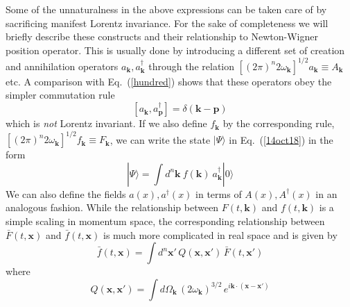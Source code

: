 \documentclass[12pt]{article}
\def\eq#1{{Eq.~(\ref{#1})}}
\def\ket#1{|#1\rangle}                    %
\begin{document}
Some of the  unnaturalness in the above expressions can be taken care of by sacrificing manifest Lorentz invariance.
 For the sake of completeness we will briefly describe these constructs and their relationship to Newton-Wigner position operator.
This is usually done by introducing a different set of creation and annihilation operators $a_{\bm{k}}, a^\dagger_{\bm{k}}$ through the relation 
 $
 [(2\pi)^n 2\omega_{\bm{k}}]^{1/2} a_{\bm{k}} \equiv A_{\bm{k}}
 $ 
 etc. A comparison with \eq{hundred} shows that these operators obey the simpler commutation rule 
 \begin{equation}
 \left[ a_{\bm{k}}, a^\dagger_{\bm{p}}\right] = \delta (\bm{k} - \bm{p})
 \end{equation} 
 which is \textit{not} Lorentz invariant. If we also define $f_{\bm{k}}$ by the corresponding rule, 
 $
 [(2\pi)^n 2\omega_{\bm{k}}]^{1/2} f_{\bm{k}} \equiv F_{\bm{k}}
 $, 
 we can write the state $\ket{\Psi}$ in \eq{14oct18} in the form 
 \begin{equation}
 \ket{\Psi} = \int d^n \bm{k}\ f(\bm{k})\ a^\dagger_{\bm{k}} \ket{0}
 \end{equation} 
 We can also define the fields $a(x), a^\dagger(x)$ in terms of $A(x), A^\dagger(x)$ in an analogous fashion. 
 While the relationship between $F(t, \bm{k})$ and $f(t, \bm{k})$ is a simple scaling in momentum space, the corresponding relationship between $\bar F(t, \bm{x})$ and $\bar f(t, \bm{x})$ is much more complicated in real space and is given by
 \begin{equation}
 \bar f(t,\bm{x}) = \int d^n \bm{x}' \, Q(\bm{x}, \bm{x}')\, \bar F(t, \bm{x}')
 \end{equation} 
 where 
 \begin{equation}
 Q(\bm{x}, \bm{x}') = \int d\Omega_{\bm{k}} \, (2\omega_{\bm{k}})^{3/2}\, e^{i\bm{k}\cdot (\bm{x}-\bm{x}')}
 \end{equation} 
 
\end{document}
